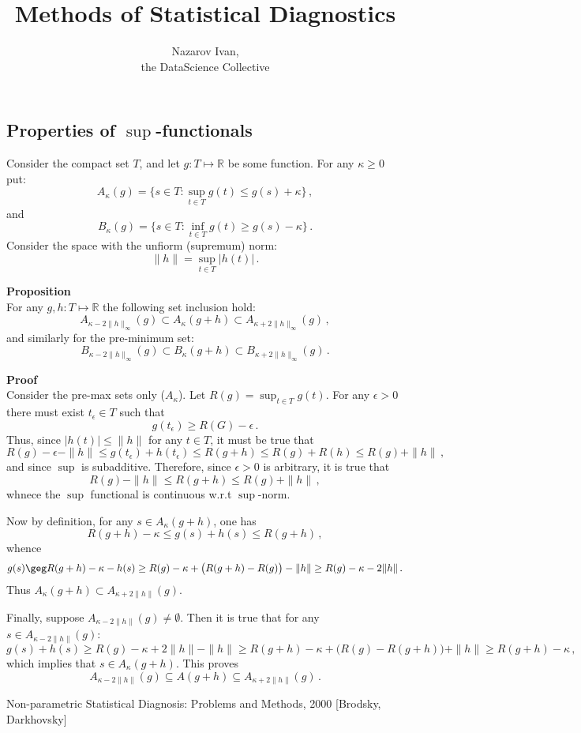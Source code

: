 \documentclass[a4paper]{article}
\title{Methods of Statistical Diagnostics}
\author{Nazarov Ivan, \rus{201мНОД(ИССА)}\\the DataScience Collective}
\newcommand{\Real}{\mathbb{R}}
\begin{document}
\maketitle

\subsection{Properties of $\sup$-functionals} %
\label{sub:properties_of_sup_functionals}

Consider the compact set $T$, and let $g:T\mapsto \Real$ be some function.
For any $\kappa\geq 0$ put:
\[ A_\kappa(g) = \bigl\{ s\in T : \sup_{t\in T} g(t) \leq g(s) + \kappa \bigr\}\,, \]
and
\[ B_\kappa(g) = \bigl\{ s\in T : \inf_{t\in T} g(t) \geq g(s) - \kappa \bigr\}\,. \]
Consider the space with the unfiorm (supremum) norm:
\[ \|h\| = \sup_{t\in T} |h(t)| \,. \]

\noindent\textbf{Proposition}\hfill\\
For any $g, h:T\mapsto \Real$ the following set inclusion hold:
\[ A_{\kappa - 2\|h\|_\infty}(g) \subset A_\kappa(g+h)
                                 \subset A_{\kappa + 2\|h\|_\infty}(g)\,, \]
and similarly for the pre-minimum set:
\[ B_{\kappa - 2\|h\|_\infty}(g) \subset B_\kappa(g+h)
                                 \subset B_{\kappa + 2\|h\|_\infty}(g)\,. \]

\noindent \textbf{Proof}\hfill\\
Consider the pre-max sets only ($A_\kappa$). Let $R(g) = \sup_{t\in T} g(t)$.
For any $\epsilon>0$ there must exist $t_\epsilon\in T$ such that
\[ g(t_\epsilon) \geq R(G) - \epsilon \,. \]
Thus, since $|h(t)| \leq \|h\|$ for any $t\in T$, it must be true that
\[ R(g) - \epsilon - \|h\| \leq g(t_\epsilon) + h(t_\epsilon)
                           \leq R(g + h)
                           \leq R(g) + R(h)
                           \leq R(g) + \|h\|\,,
\]
and since $\sup$ is subadditive. Therefore, since $\epsilon>0$ is arbitrary,
it is true that
\[ R(g) - \|h\| \leq R(g + h) \leq R(g) + \|h\|\,, \]
whnece the $\sup$ functional is continuous w.r.t $\sup$-norm.

Now by definition, for any $s\in A_\kappa(g+h)$, one has
\[ R(g+h) - \kappa \leq g(s)+h(s) \leq R(g+h)\,, \]
whence
\[ g(s) \geg R(g+h) - \kappa - h(s)
        \geq R(g) - \kappa + \bigl(R(g+h) - R(g)\bigr) - \|h\|
        \geq R(g) - \kappa - 2\|h\|\,. \]
Thus $A_\kappa(g+h) \subset A_{\kappa + 2\|h\|}(g)$.

Finally, suppose $A_{\kappa-2\|h\|}(g) \neq \emptyset$. Then it is true that
for any $s\in A_{\kappa-2\|h\|}(g)$:
\[ g(s) + h(s) \geq R(g) - \kappa + 2\|h\| - \|h\|
               \geq R(g+h) - \kappa + \bigl( R(g) - R(g+h) \bigr) + \|h\|
               \geq R(g+h) - \kappa \,,\]
which implies that $s\in A_\kappa(g+h)$. This proves
\[ A_{\kappa-2\|h\|}(g)\subseteq A(g+h) \subseteq A_{\kappa+2\|h\|}(g) \,.\]


Non-parametric Statistical Diagnosis: Problems and Methods, 2000 [Brodsky, Darkhovsky]
\end{document}
